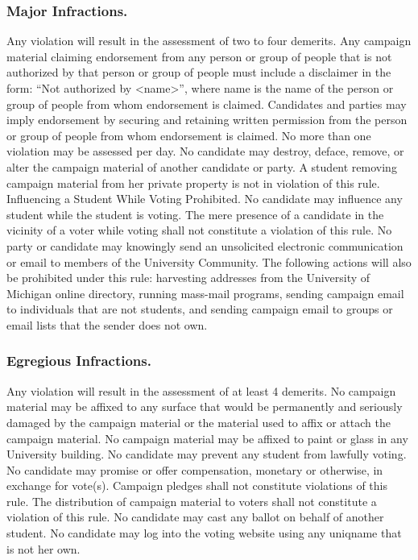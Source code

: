 \subsubsection{Major Infractions.}
Any violation will result in the assessment of two to four demerits.
Any campaign material claiming endorsement from any person or group of people that is not authorized by that person or group of people must include a disclaimer in the form: ``Not authorized by <name>'', where name is the name of the person or group of people from whom endorsement is claimed.  Candidates and parties may imply endorsement by securing and retaining written permission from the person or group of people from whom endorsement is claimed. No more than one violation may be assessed per day.
No candidate may destroy, deface, remove, or alter the campaign material of another candidate or party. A student removing campaign material from her private property is not in violation of this rule.
Influencing a Student While Voting Prohibited.  No candidate may influence any student while the student is voting. The mere presence of a candidate in the vicinity of a voter while voting shall not constitute a violation of this rule. 
No party or candidate may knowingly send an unsolicited electronic communication or email to members of the University Community. The following actions will also be prohibited under this rule: harvesting addresses from the University of Michigan online directory, running mass-mail programs, sending campaign email to individuals that are not students, and sending campaign email to groups or email lists that the sender does not own.

\subsubsection{Egregious Infractions.}
Any violation will result in the assessment of at least 4 demerits.
No campaign material may be affixed to any surface that would be permanently and seriously damaged by the campaign material or the material used to affix or attach the campaign material. No campaign material may be affixed to paint or glass in any University building.
No candidate may prevent any student from lawfully voting.
No candidate may promise or offer compensation, monetary or otherwise, in exchange for vote(s).  Campaign pledges shall not constitute violations of this rule. The distribution of campaign material to voters shall not constitute a violation of this rule.
No candidate may cast any ballot on behalf of another student. No candidate may log into the voting website using any uniqname that is not her own.


